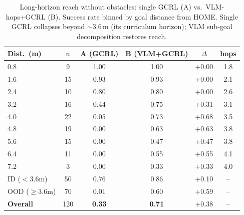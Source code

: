 \begin{table}[t]
\centering
\caption{Long-horizon reach without obstacles: single GCRL (A) vs.\ VLM-hops+GCRL (B). Success rate binned by goal distance from HOME. Single GCRL collapses beyond $\sim$3.6\,m (its curriculum horizon); VLM sub-goal decomposition restores reach.}
\label{tab:rq2_longhorizon}
\begin{tabular}{lccccc}
\toprule
Dist.\ (m) & $n$ & A (GCRL) & B (VLM+GCRL) & $\Delta$ & hops \\
\midrule
0.8 & 9 & 1.00 & 1.00 & +0.00 & 1.8 \\
1.6 & 15 & 0.93 & 0.93 & +0.00 & 2.1 \\
2.4 & 10 & 0.80 & 0.80 & +0.00 & 2.6 \\
3.2 & 16 & 0.44 & 0.75 & +0.31 & 3.1 \\
4.0 & 22 & 0.05 & 0.73 & +0.68 & 3.5 \\
4.8 & 19 & 0.00 & 0.63 & +0.63 & 3.8 \\
5.6 & 15 & 0.00 & 0.47 & +0.47 & 3.8 \\
6.4 & 11 & 0.00 & 0.55 & +0.55 & 4.1 \\
7.2 & 3 & 0.00 & 0.33 & +0.33 & 4.0 \\
\midrule
ID ($<$3.6m) & 50 & 0.76 & 0.86 & +0.10 & -- \\
OOD ($\geq$3.6m) & 70 & 0.01 & 0.60 & +0.59 & -- \\
\textbf{Overall} & 120 & \textbf{0.33} & \textbf{0.71} & +0.38 & -- \\
\bottomrule
\end{tabular}
\end{table}